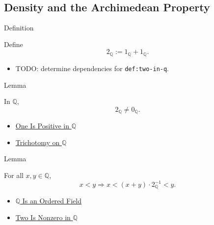 \subsection*{Density and the Archimedean Property}

\begin{definitionbox}{Definition}
\begin{definition}
\label{def:two-in-q}
Define
\[
2_{\mathbb{Q}}:=1_{\mathbb{Q}}+1_{\mathbb{Q}}.
\]
\end{definition}
\end{definitionbox}

\begin{dependencies}
\begin{itemize}
  \item TODO: determine dependencies for \texttt{def:two-in-q}.
\end{itemize}
\end{dependencies}

\begin{lemmabox}{Lemma}
\begin{lemma}
\label{lem:two-nonzero-in-q}
In $\mathbb{Q}$,
\[
2_{\mathbb{Q}}\ne 0_{\mathbb{Q}}.
\]
\end{lemma}
\end{lemmabox}

\begin{dependencies}
\begin{itemize}
  \item \hyperref[cor:one-positive-on-q]{One Is Positive in $\mathbb{Q}$}
  \item \hyperref[thm:trichotomy-on-q]{Trichotomy on $\mathbb{Q}$}
\end{itemize}
\end{dependencies}

\begin{lemmabox}{Lemma}
\begin{lemma}
\label{lem:midpoint-between-q}
For all $x,y\in\mathbb{Q}$,
\[
x<y
\Longrightarrow
x< (x+y)\cdot 2_{\mathbb{Q}}^{-1}<y.
\]
\end{lemma}
\end{lemmabox}

\begin{dependencies}
\begin{itemize}
  \item \hyperref[thm:q-is-an-ordered-field]{$\mathbb{Q}$ Is an Ordered Field}
  \item \hyperref[lem:two-nonzero-in-q]{Two Is Nonzero in $\mathbb{Q}$}
\end{itemize}
\end{dependencies}


